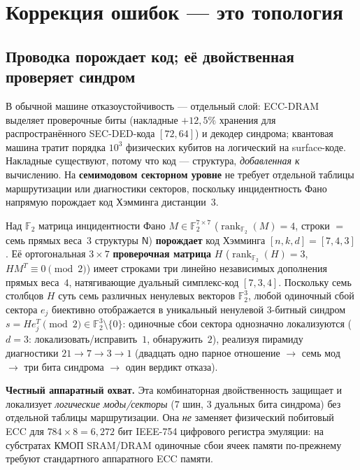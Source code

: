\section{Коррекция ошибок --- это топология}
\label{sec:ecc}

\subsection{Проводка порождает код; её двойственная проверяет синдром}

В обычной машине отказоустойчивость --- отдельный слой: ECC-DRAM выделяет
проверочные биты (накладные $+12{,}5\%$ хранения для распространённого
SEC-DED-кода $[72,64]$) и декодер синдрома; квантовая машина тратит порядка
$10^3$ физических кубитов на логический на surface-коде. Накладные существуют,
потому что код --- структура, \emph{добавленная к} вычислению. На
\textbf{семимодовом секторном уровне} \TALOS{} не требует отдельной таблицы
маршрутизации или диагностики секторов, поскольку инцидентность Фано напрямую
порождает код Хэмминга дистанции~$3$.

\begin{claimbox}
Над $\mathbb{F}_2$ матрица инцидентности Фано $M\in\mathbb{F}_2^{7\times 7}$
($\operatorname{rank}_{\mathbb{F}_2}(M)=4$, строки $=$ семь прямых веса~$3$
структуры $\mathsf{N}$) \textbf{порождает} код Хэмминга $[n,k,d]=[7,4,3]$. Её
ортогональная $3\times 7$ \textbf{проверочная матрица} $H$
($\operatorname{rank}_{\mathbb{F}_2}(H)=3$, $HM^T\equiv 0\pmod 2$) имеет
строками три линейно независимых дополнения прямых веса~$4$, натягивающие
дуальный симплекс-код $[7,3,4]$. Поскольку семь столбцов $H$ суть семь различных
ненулевых векторов $\mathbb{F}_2^3$, любой одиночный сбой сектора $e_j$
биективно отображается в уникальный ненулевой $3$-битный синдром
$s = He_j^T \pmod 2 \in \mathbb{F}_2^3\setminus\{0\}$: одиночные сбои сектора
однозначно локализуются ($d=3$: локализовать/исправить~$1$, обнаружить~$2$),
реализуя пирамиду диагностики $21\to 7\to 3\to 1$ (двадцать одно парное
отношение $\to$ семь мод $\to$ три бита синдрома $\to$ один вердикт отказа).
\end{claimbox}

\noindent\textbf{Честный аппаратный охват.} Эта комбинаторная двойственность
защищает и локализует \emph{логические моды/секторы} ($7$ шин, $3$ дуальных бита
синдрома) без отдельной таблицы маршрутизации. Она \emph{не} заменяет
физический побитовый ECC для $784\times 8 = 6{,}272$ бит IEEE-754 цифрового
регистра эмуляции: на субстратах КМОП SRAM/DRAM одиночные сбои ячеек памяти
по-прежнему требуют стандартного аппаратного ECC памяти.

